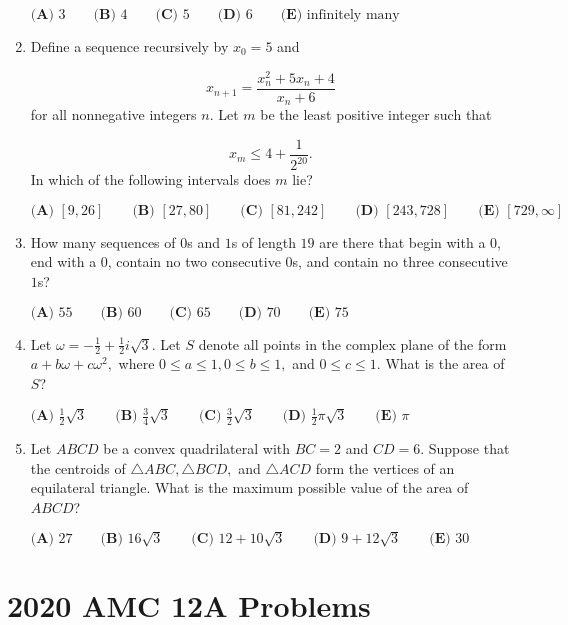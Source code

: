 \documentclass{article}
\begin{document}
\begin{enumerate}[label=\arabic*., itemsep=0.5em]
\(\textbf{(A) } 3 \qquad\textbf{(B) } 4 \qquad\textbf{(C) } 5 \qquad\textbf{(D) } 6 \qquad\textbf{(E) } \text{infinitely many}\)\par \vspace{0.5em}\item Define a sequence recursively by \(x_0=5\) and

\begin{equation*}
x_{n+1}=\frac{x_n^2+5x_n+4}{x_n+6}
\end{equation*}
for all nonnegative integers \(n.\) Let \(m\) be the least positive integer such that

\begin{equation*}
x_m\leq 4+\frac{1}{2^{20}}.
\end{equation*}
In which of the following intervals does \(m\) lie?

\(\textbf{(A) } [9,26] \qquad\textbf{(B) } [27,80] \qquad\textbf{(C) } [81,242]\qquad\textbf{(D) } [243,728] \qquad\textbf{(E) } [729,\infty]\)\par \vspace{0.5em}\item How many sequences of \(0\)s and \(1\)s of length \(19\) are there that begin with a \(0\), end with a \(0\), contain no two consecutive \(0\)s, and contain no three consecutive \(1\)s?

\(\textbf{(A) }55\qquad\textbf{(B) }60\qquad\textbf{(C) }65\qquad\textbf{(D) }70\qquad\textbf{(E) }75\)\par \vspace{0.5em}\item Let \(\omega=-\tfrac{1}{2}+\tfrac{1}{2}i\sqrt3.\) Let \(S\) denote all points in the complex plane of the form \(a+b\omega+c\omega^2,\) where \(0\leq a \leq 1,0\leq b\leq 1,\) and \(0\leq c\leq 1.\) What is the area of \(S\)?

\(\textbf{(A) } \frac{1}{2}\sqrt3 \qquad\textbf{(B) } \frac{3}{4}\sqrt3 \qquad\textbf{(C) } \frac{3}{2}\sqrt3\qquad\textbf{(D) } \frac{1}{2}\pi\sqrt3 \qquad\textbf{(E) } \pi\)\par \vspace{0.5em}\item Let \(ABCD\) be a convex quadrilateral with \(BC=2\) and \(CD=6.\) Suppose that the centroids of \(\triangle ABC,\triangle BCD,\) and \(\triangle ACD\) form the vertices of an equilateral triangle. What is the maximum possible value of the area of \(ABCD\)?

\(\textbf{(A) } 27 \qquad\textbf{(B) } 16\sqrt3 \qquad\textbf{(C) } 12+10\sqrt3 \qquad\textbf{(D) } 9+12\sqrt3 \qquad\textbf{(E) } 30\)\par \vspace{0.5em}\end{enumerate}\newpage\section*{2020 AMC 12A Problems}
\end{document}
